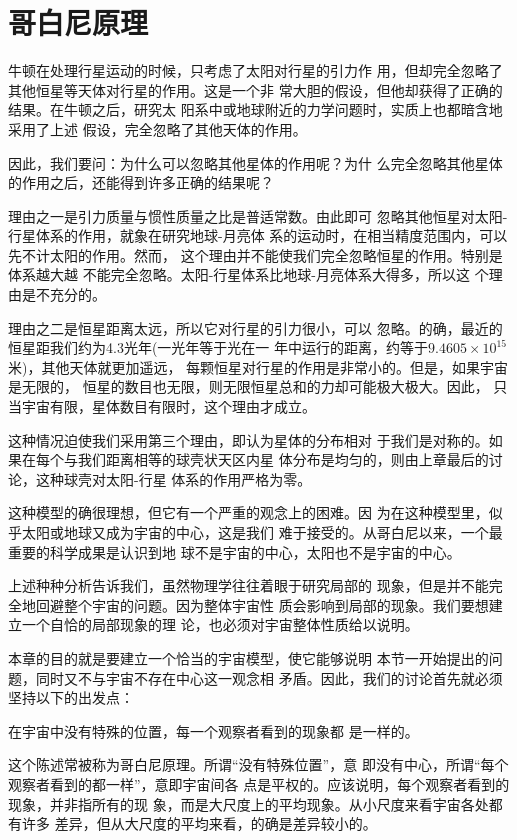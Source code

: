 \section{哥白尼原理}\label{sec:05.01}

牛顿在处理行星运动的时候，只考虑了太阳对行星的引力作
用，但却完全忽略了其他恒星等天体对行星的作用。这是一个非
常大胆的假设，但他却获得了正确的结果。在牛顿之后，研究太
阳系中或地球附近的力学问题时，实质上也都暗含地采用了上述
假设，完全忽略了其他天体的作用。

因此，我们要问：为什么可以忽略其他星体的作用呢？为什
么完全忽略其他星体的作用之后，还能得到许多正确的结果呢？

理由之一是引力质量与惯性质量之比是普适常数。由此即可
忽略其他恒星对太阳-行星体系的作用，就象在研究地球-月亮体
系的运动时，在相当精度范围内，可以先不计太阳的作用。然而，
这个理由并不能使我们完全忽略恒星的作用。特别是体系越大越
不能完全忽略。太阳-行星体系比地球-月亮体系大得多，所以这
个理由是不充分的。

理由之二是恒星距离太远，所以它对行星的引力很小，可以
忽略。的确，最近的恒星距我们约为4.3光年(一光年等于光在一
年中运行的距离，约等于$ 9.4605 \times 10 ^ { 15 } $米)，其他天体就更加遥远，
每颗恒星对行星的作用是非常小的。但是，如果宇宙是无限的，
恒星的数目也无限，则无限恒星总和的力却可能极大极大。因此，
只当宇宙有限，星体数目有限时，这个理由才成立。

这种情况迫使我们采用第三个理由，即认为星体的分布相对
于我们是对称的。如果在每个与我们距离相等的球壳状天区内星
体分布是均匀的，则由上章最后的讨论，这种球壳对太阳-行星
体系的作用严格为零。

这种模型的确很理想，但它有一个严重的观念上的困难。因
为在这种模型里，似乎太阳或地球又成为宇宙的中心，这是我们
难于接受的。从哥白尼以来，一个最重要的科学成果是认识到地
球不是宇宙的中心，太阳也不是宇宙的中心。

上述种种分析告诉我们，虽然物理学往往着眼于研究局部的
现象，但是并不能完全地回避整个宇宙的问题。因为整体宇宙性
质会影响到局部的现象。我们要想建立一个自恰的局部现象的理
论，也必须对宇宙整体性质给以说明。

本章的目的就是要建立一个恰当的宇宙模型，使它能够说明
本节一开始提出的问题，同时又不与宇宙不存在中心这一观念相
矛盾。因此，我们的讨论首先就必须坚持以下的出发点：

\begin{quoting}
  在宇宙中没有特殊的位置，每一个观察者看到的现象都
  是一样的。
\end{quoting}

这个陈述常被称为哥白尼原理。所谓“没有特殊位置”，意
即没有中心，所谓“每个观察者看到的都一样”，意即宇宙间各
点是平权的。应该说明，每个观察者看到的现象，并非指所有的现
象，而是大尺度上的平均现象。从小尺度来看宇宙各处都有许多
差异，但从大尺度的平均来看，的确是差异较小的。
